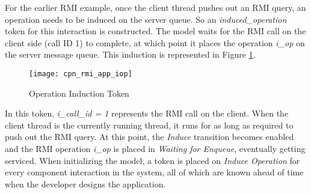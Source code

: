 For the earlier RMI example, once the client thread pushes out an RMI query, an operation needs to be induced on the server queue. So an \emph{induced\_operation} token for this interaction is constructed. The model waits for the RMI call on the client side (call ID 1) to complete, at which point it places the operation \emph{i\_op} on the server message queue. This induction is represented in Figure \ref{fig:cpn_rmi_app_iop}. 

\vspace{-0.08in}
\begin{figure}[ht]
\centering
\texttt{[image: cpn\_rmi\_app\_iop]}
\caption{Operation Induction Token}
\label{fig:cpn_rmi_app_iop}
\vspace{-0.16in}
\end{figure}

In this token, \emph{i\_call\_id = 1} represents the RMI call on the client. When the client thread is the currently running thread, it runs for as long as required to push out the RMI query. At this point, the \emph{Induce} transition becomes enabled and the RMI operation \emph{i\_op} is placed in \emph{Waiting for Enqueue}, eventually getting serviced. When initializing the model, a token is placed on \emph{Induce Operation} for every component interaction in the system, all of which are known ahead of time when the developer designs the application.